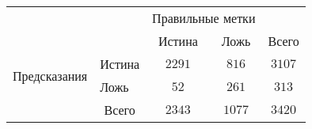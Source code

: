 \begin{tabular}{l|l|c|c|c}
	\multicolumn{2}{c}{}&\multicolumn{2}{c}{Правильные метки}&\\
	\cline{3-4}
	\multicolumn{2}{c|}{}&Истина&Ложь&\multicolumn{1}{c}{Всего}\\
	\cline{2-4}
	\multirow{2}{*}{Предсказания }& Истина & $ 2291 $ & $ 816 $ & $ 3107$\\
	\cline{2-4}
	& Ложь & $52$ & $261$ & $ 313 $\\
	\cline{2-4}
	\multicolumn{1}{c}{} & \multicolumn{1}{c}{Всего} & \multicolumn{1}{c}{$2343$} & \multicolumn{1}{c}{$1077$} & \multicolumn{1}{c}{$3420$}\\
\end{tabular}



